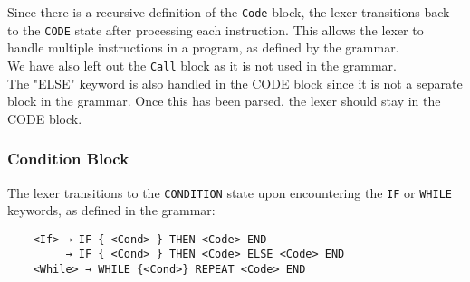 \documentclass{article}
\begin{document}
	Since there is a recursive definition of the \texttt{Code} block, the lexer transitions back to the \texttt{CODE} state after processing each instruction. This allows the lexer to handle multiple instructions in a program, as defined by the grammar.\\

	We have also left out the \texttt{Call} block as it is not used in the grammar.\\

	The "ELSE" keyword is also handled in the CODE block since it is not a separate block in the grammar. Once this has been parsed, the lexer should stay in the CODE block.\\


	\subsubsection{Condition Block}
	The lexer transitions to the \texttt{CONDITION} state upon encountering the \texttt{IF} or \texttt{WHILE} keywords, as defined in the grammar:

	\begin{verbatim}
	<If> → IF { <Cond> } THEN <Code> END
		 → IF { <Cond> } THEN <Code> ELSE <Code> END
	<While> → WHILE {<Cond>} REPEAT <Code> END
	\end{verbatim}
\end{document}
